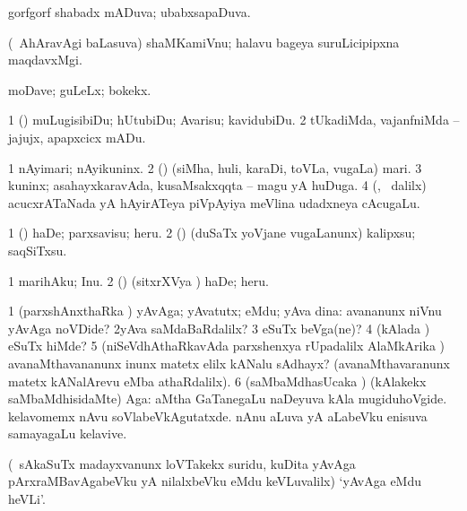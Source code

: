 \bentry
{} 
\gl{\gu}
\bmng
gorfgorf shabadx mADuva; ubabxsapaDuva. 
\emng
\eentry

\bentry
{} 
\gl{\nA}
\expl{}
\bmng
(\kanmu\ AhAravAgi baLasuva) shaMKamiVnu; halavu bageya suruLicipipxna maqdavxMgi. 
\emng
\eentry

\bentry
{}
\gl{\nA}
\expl{}
\bmng
moDave; guLeLx; bokekx. 
\emng
\eentry

\bentry
{} 
\gl{\sakirx}
\expl{}
\bmng
\bnum
\num{1} (\kAparx) muLugisibiDu; hUtubiDu; Avarisu; kavidubiDu. 
\num{2} tUkadiMda, vajanfniMda -- jajujx, apapxcicx mADu. 
\enum
\emng
\eentry

\bentry
{} 
\gl{\nA}
\expl{}
\bmng
\bnum
\num{1} nAyimari; nAyikuninx. 
\num{2} (\pArxparx) (siMha, huli, karaDi, toVLa, \mo vugaLa) mari. 
\num{3} kuninx; asahayxkaravAda, kusaMsakxqqta -- magu yA huDuga. 
\num{4} (\nw, \kanmu\ \bava dalilx) acucxrATaNada yA hAyirATeya piVpAyiya meVlina udadxneya cAcugaLu. 
\enum
\emng
\eentry

\bentry
{} 
\gl{\sakirx}
\expl{}
\bmng
\bnum
\num{1} (\hiV) haDe; parxsavisu; heru. 
\num{2} (\rUpa) (duSaTx yoVjane \mo vugaLanunx) kalipxsu; saqSiTxsu. 
\enum
\emng

\noindent 
\gl{\akirx}
\expl{}
\bmng
\bnum
\num{1} marihAku; Inu. 
\num{2} (\hiV) (sitxrXVya \vi) haDe; heru. 
\enum
\emng
\eentry

\bentry
{} 
\gl{\kirxvi}
\expl{}
\bmng
\bnum
\num{1} (parxshAnxthaRka \kirxvi) yAvAga; yAvatutx; eMdu; yAva dina:  avananunx niVnu yAvAga noVDide? 
\num{2}yAva saMdaBaRdalilx? 
\num{3} eSuTx beVga(ne)? 
\num{4} (kAlada \vi) eSuTx hiMde? 
\num{5} (niSeVdhAthaRkavAda parxshenxya rUpadalilx AlaMkArika \parx)  avanaMthavananunx inunx matetx elilx kANalu sAdhayx? (avanaMthavaranunx matetx kANalArevu eMba athaRdalilx). 
\num{6} (saMbaMdhasUcaka \kirxvi) (kAlakekx saMbaMdhisidaMte) Aga:  aMtha GaTanegaLu naDeyuva kAla mugiduhoVgide.  kelavomemx nAvu soVlabeVkAgutatxde.  nAnu aLuva yA aLabeVku enisuva samayagaLu kelavive. 
\enum
\emng

\noindent 
\gl{\pagu}
\expl{}
\bmng
{} (\kanmu\ sAkaSuTx madayxvanunx loVTakekx suridu, kuDita yAvAga pArxraMBavAgabeVku yA nilalxbeVku eMdu keVLuvalilx) `yAvAga eMdu heVLi'. 
\emng
\eentry

